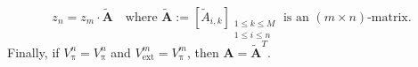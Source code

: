 \documentclass[a4paper]{paper}
\newcommand{\Spc}[1]{\mathscr{#1}}
\newcommand{\Field}{\mathbb{F}}
\newcommand{\Real}{\mathbb{R}}
\newcommand{\DiscOp}[1]{\mathsf{#1}}
\DeclareMathOperator{\rest}{\pi}
\newcommand{\vA}{\boldsymbol{A}}
\newcommand{\cF}{\mathcal{F}}
\newcommand{\ext}{\text{ext}}
\newcommand{\wt}[1]{\widetilde{#1}}
\begin{document}
\[ z_{n}=z_{m}\cdot\wt{\vA}
   \quad\text{where } 
   \wt{\vA}:=[ \wt{A}_{i,k} ]_{\substack{1\leq k \leq M \\ 
   1\leq i \leq n}}
   \text{ is an $(m\times n)$-matrix.} \]
Finally, if $V^n_{\rest}=V^n_{\rest}$ and 
$V^m_{\ext}=V^m_{\rest}$, then $\vA=\wt{\vA}^T$. 
%
%
%
%
%
%
\end{document}
